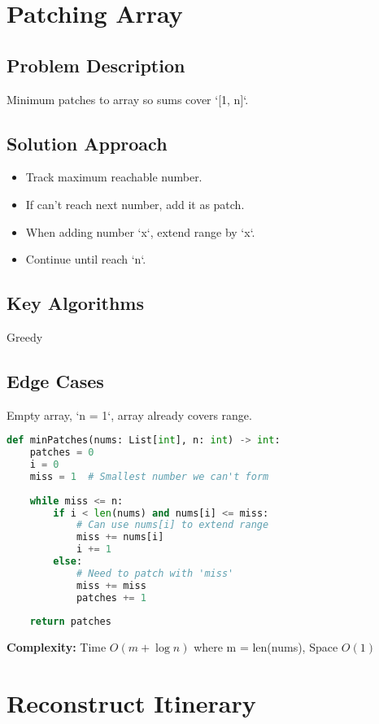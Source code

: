 \documentclass[10pt, a4paper]{article}
\begin{document}
\section{Patching Array}
\subsection*{Problem Description}
Minimum patches to array so sums cover `[1, n]`.

\subsection*{Solution Approach}
\begin{itemize}
    \item Track maximum reachable number.
    \item If can't reach next number, add it as patch.
    \item When adding number `x`, extend range by `x`.
    \item Continue until reach `n`.
\end{itemize}

\subsection*{Key Algorithms}
Greedy

\subsection*{Edge Cases}
Empty array, `n = 1`, array already covers range.

\begin{lstlisting}[language=Python]
def minPatches(nums: List[int], n: int) -> int:
    patches = 0
    i = 0
    miss = 1  # Smallest number we can't form
    
    while miss <= n:
        if i < len(nums) and nums[i] <= miss:
            # Can use nums[i] to extend range
            miss += nums[i]
            i += 1
        else:
            # Need to patch with 'miss'
            miss += miss
            patches += 1
    
    return patches
\end{lstlisting}
\textbf{Complexity:} Time $O(m + \log n)$ where m = len(nums), Space $O(1)$

\section{Reconstruct Itinerary}
\end{document}
